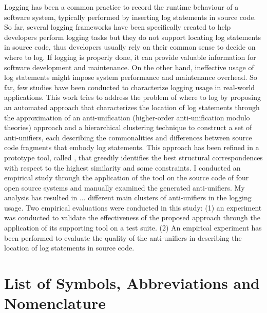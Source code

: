 \documentclass{ucalgthes1}
\theoremstyle{plain}
\theoremstyle{definition}
\newcommand{\tool}{\relax}
\begin{document}
\newpage
{}
{}
Logging has been a common practice to record the runtime behaviour of a software system, typically performed by inserting log statements in source code. So far, several logging frameworks have been specifically created to help developers perform logging tasks but they do not support locating log statements in source code, thus developers usually rely on their common sense to decide on where to log. If logging is properly done, it can provide valuable information for software development and maintenance. On the other hand, ineffective usage of log statements might impose system performance and maintenance overhead. So far, few studies have been conducted to characterize logging usage in real-world applications. This work tries to address the problem of where to log by proposing an automated approach that characterizes the location of log statements through the approximation of an anti-unification (higher-order anti-unification modulo theories) approach and a hierarchical clustering technique to construct a set of anti-unifiers, each describing the commonalities and differences between source code fragments that embody log statements. This approach has been refined in a prototype tool, called \tool{ELUS}, that greedily identifies the best structural correspondences with respect to the highest similarity and some constraints. I conducted an empirical study through the application of the tool on the source code of four open source systems and manually examined the generated anti-unifiers. My analysis has resulted in ... different main clusters of anti-unifiers in the logging usage. Two empirical evaluations were conducted in this study: (1) an experiment was conducted to validate the effectiveness of the proposed approach through the application of its supporting tool on a test suite. (2) An empirical experiment has been performed to evaluate the quality of the anti-unifiers in describing the location of log statements in source code. 

\newpage
{}
{}


\begin{singlespace}
\newpage
{}
\tableofcontents
\pagestyle{plain}
\newpage
{}
\listoftables
\pagestyle{plain}
\newpage
{}
\listoffigures
\pagestyle{plain}
\clearpage
\clearpage          %
\end{singlespace}
\newpage
{}
\chapter*{\bf{List of Symbols, Abbreviations and Nomenclature}\hfill} 
\listofsymbols
\pagestyle{plain}
\clearpage
\end{document}
